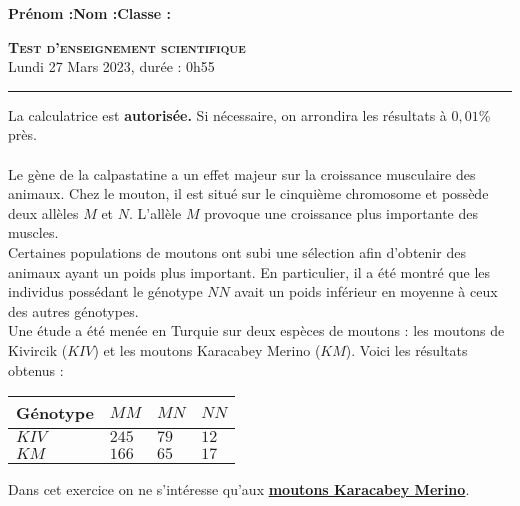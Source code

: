 \documentclass[11pt]{article}
\begin{document}

\newpage
\setcounter{numexos}{0}

\noindent\textbf{Prénom :}\hfill\textbf{Nom :}\hfill\textbf{Classe :}\\[1cm]
\begin{center}
\textbf{\LARGE \textsc{Test d'enseignement scientifique}}\\[2mm]

{\large Lundi 27 Mars 2023, durée : 0h55}\\[1mm]
\noindent\rule{12cm}{0.4pt}
\end{center}
La calculatrice est \textbf{autorisée.} Si nécessaire, on arrondira les
résultats à $0,01$\% près.\\[1cm]


\exercice \\

Le gène de la calpastatine a un effet majeur sur la croissance musculaire des animaux. Chez le mouton, il est situé sur le cinquième chromosome et possède deux allèles $M$ et $N$. L’allèle $M$ provoque une croissance plus importante des muscles.\\
Certaines populations de moutons ont subi une sélection afin d’obtenir des animaux ayant un poids plus important. En particulier, il a été montré que les individus possédant le génotype $NN$ avait un poids inférieur en moyenne à ceux des autres génotypes.\\
Une étude a été menée en Turquie sur deux espèces de moutons : les moutons de Kivircik
($KIV$) et les moutons Karacabey Merino ($KM$). Voici les résultats obtenus :
\begin{center}
	\begin{tabular}{|>{\centering\arraybackslash}m{3cm}|>{\centering\arraybackslash}m{3cm}|>{\centering\arraybackslash}m{3cm}|>{\centering\arraybackslash}m{3cm}|}
		\hline
		\rule[-1ex]{0pt}{2.5ex}  \textbf{Génotype} & $MM$ & $MN$ & $NN$  \\
		\hline
		\rule[-1ex]{0pt}{2.5ex}  $KIV$ & $245$ & $79$ & $12$  \\
		\hline
		\rule[-1ex]{0pt}{2.5ex} $KM$ & $166$ & $65$ & $17$  \\
		\hline
	\end{tabular}
\end{center}

Dans cet exercice on ne s'intéresse qu'aux \underline{\textbf{moutons Karacabey Merino}}.
\end{document}
